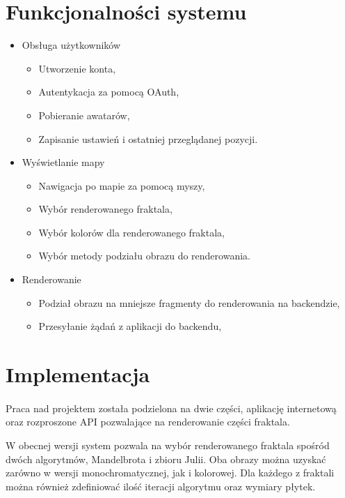 \documentclass[wide,a4paper,titlepage,12pt]{article}
\begin{document}
\newpage
\section{Funkcjonalności systemu}

\begin{itemize}
  \item Obsługa użytkowników
    \begin{itemize}
      \item Utworzenie konta,
      \item Autentykacja za pomocą OAuth,
      \item Pobieranie awatarów,
      \item Zapisanie ustawień i ostatniej przeglądanej pozycji.
    \end{itemize}
  \item Wyświetlanie mapy
    \begin{itemize}
      \item Nawigacja po mapie za pomocą myszy,
      \item Wybór renderowanego fraktala,
      \item Wybór kolorów dla renderowanego fraktala,
      \item Wybór metody podziału obrazu do renderowania.
    \end{itemize}
  \item Renderowanie
    \begin{itemize}
      \item Podział obrazu na mniejsze fragmenty do renderowania na backendzie,
      \item Przesyłanie żądań z aplikacji do backendu,
    \end{itemize}
\end{itemize}

\section{Implementacja}
\paragraph{}
Praca nad projektem została podzielona na dwie części, aplikację internetową
oraz rozproszone API pozwalające na renderowanie części fraktala.

W obecnej wersji system pozwala na wybór renderowanego fraktala spośród dwóch algorytmów,
Mandelbrota i zbioru Julii. Oba obrazy można uzyskać zarówno w wersji monochromatycznej, 
jak i kolorowej. Dla każdego z fraktali można również zdefiniować ilość iteracji algorytmu oraz
wymiary płytek. 
\end{document}
